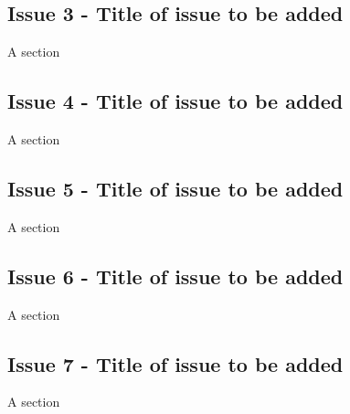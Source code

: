 \documentclass{article}
\begin{document}
\subsection{Issue 3 - Title of issue to be added}
A section

\subsection{Issue 4 - Title of issue to be added}
A section

\subsection{Issue 5 - Title of issue to be added}
A section

\subsection{Issue 6 - Title of issue to be added}
A section

\subsection{Issue 7 - Title of issue to be added}
A section
\end{document}
